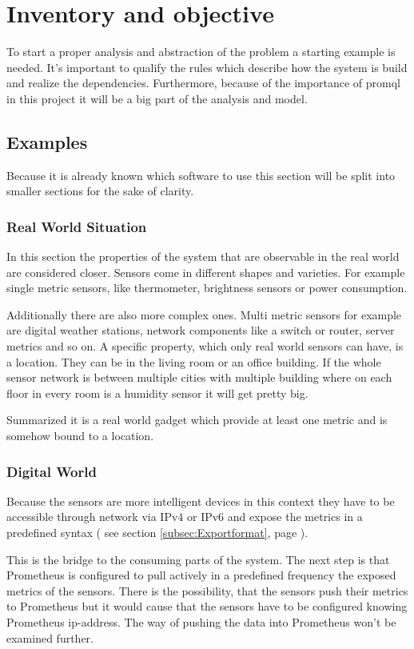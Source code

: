 \chapter{Inventory and objective}
\label{chapter:bestandsaufnahme}
To start a proper analysis and abstraction of the problem a starting example is needed. It's important to qualify the rules which describe how the system is build and realize the dependencies. Furthermore, because of the importance of \gls{promql} in this project it will be a big part of the analysis and model.
\section{Examples}
Because it is already known which software to use this section will be split into smaller sections for the sake of clarity. 

\subsection{Real World Situation}
In this section the properties of the system that are observable in the real world are considered closer. Sensors come in different shapes and varieties. For example single metric sensors, like thermometer, brightness sensors or power consumption. 

Additionally there are also more complex ones. Multi metric sensors for example are digital weather stations, network components like a switch or router, server metrics and so on. A specific property, which only real world sensors can have, is a location. They can be in the living room or an office building. If the whole sensor network is between multiple cities with multiple building where on each floor in every room is a humidity sensor it will get pretty big.

Summarized it is a real world gadget which provide at least one metric and is somehow bound to a location.

\subsection{Digital World}
Because the sensors are more intelligent devices in this context they have to be accessible through network via \gls{IPv4} or \gls{IPv6} and expose the metrics in a predefined syntax ( see section \ref{subsec:Exportformat}, page \pageref{subsec:Exportformat} ). 

This is the bridge to the consuming parts of the system. The next step is that Prometheus is configured to pull actively in a predefined frequency the exposed metrics of the sensors. There is the possibility, that the sensors push their metrics to Prometheus but it would cause that the sensors have to be configured knowing  Prometheus \gls{ip-address}. The way of pushing the data into Prometheus won't be examined further.

